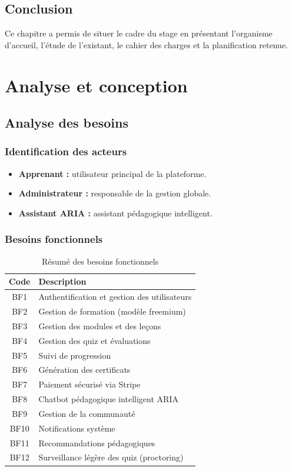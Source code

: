 \documentclass[12pt, a4paper]{report}
\begin{document}
\section{Conclusion}
Ce chapitre a permis de situer le cadre du stage en présentant l'organisme d'accueil, l'étude de l'existant, le cahier des charges et la planification retenue.

\chapter{Analyse et conception}
\section{Analyse des besoins}
\subsection{Identification des acteurs}
\begin{itemize}
    \item \textbf{Apprenant :} utilisateur principal de la plateforme.
    \item \textbf{Administrateur :} responsable de la gestion globale.
    \item \textbf{Assistant ARIA :} assistant pédagogique intelligent.
\end{itemize}

\subsection{Besoins fonctionnels}
\begin{table}[H]
\centering
\caption{Résumé des besoins fonctionnels}
\begin{tabularx}{\textwidth}{|c|X|}
\hline
\textbf{Code} & \textbf{Description} \\
\hline
BF1 & Authentification et gestion des utilisateurs \\
\hline
BF2 & Gestion de formation (modèle freemium) \\
\hline
BF3 & Gestion des modules et des leçons \\
\hline
BF4 & Gestion des quiz et évaluations \\
\hline
BF5 & Suivi de progression \\
\hline
BF6 & Génération des certificats \\
\hline
BF7 & Paiement sécurisé via Stripe \\
\hline
BF8 & Chatbot pédagogique intelligent ARIA \\
\hline
BF9 & Gestion de la communauté \\
\hline
BF10 & Notifications système \\
\hline
BF11 & Recommandations pédagogiques \\
\hline
BF12 & Surveillance légère des quiz (proctoring) \\
\hline
\end{tabularx}
\end{table}
\end{document}
